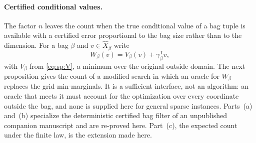 \paragraph{Certified conditional values.}
The factor $n$ leaves the count when the true conditional value of a bag
tuple is available with a certified error proportional to the bag size
rather than to the dimension. For a bag $\beta$ and $v\in\widehat X_\beta$
write
\[
 W_\beta(v)=V_\beta(v)+\gamma_\beta^{\mathsf T}v ,
\]
with $V_\beta$ from \eqref{eq:sp:V}, a minimum over the original outside
domain. The next proposition gives the count of a modified search in which
an oracle for $W_\beta$ replaces the grid min-marginals. It is a sufficient
interface, not an algorithm: an oracle that meets it must account for the
optimization over every coordinate outside the bag, and none is supplied
here for general sparse instances. Parts~(a) and~(b) specialize the
deterministic certified bag filter of an unpublished companion manuscript
\citep{companion-decomposition-aware} and are re-proved here. Part~(c), the
expected count under the finite law, is the extension made here.


